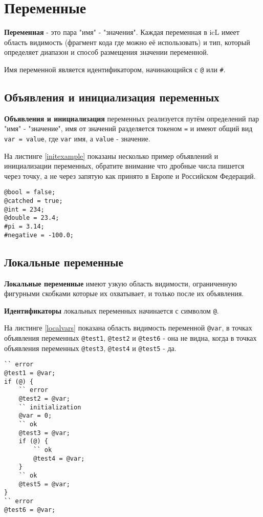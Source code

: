 \section{Переменные}

\textbf{Переменная} - это пара "имя" - "значения". Каждая переменная в icL имеет область видимость (фрагмент кода где можно её использовать) и тип, который определяет диапазон и способ размещения значении переменной.

Имя переменной является идентификатором, начинающийся с \texttt{@} или {\color{blue2}\texttt{#}}.

\subsection{Объявления и инициализация переменных}

\textbf{Объявления и инициализация} переменных реализуется путём определений пар "имя" - "значение", имя от значений разделяется токеном \texttt{=} и имеют общий вид \texttt{var = value}, где \texttt{var} имя, а \texttt{value} - значение.

На листинге \ref{initexample} показаны несколько пример объявлений и инициализации переменных, обратите внимание что дробные числа пишется через точку, а не через запятую как принято в Европе и Российском Федераций.

\begin{sourcecode}
\label{initexample}
\begin{verbatim}
@bool = false;
@catched = true;
@int = 234;
@double = 23.4;
#pi = 3.14;
#negative = -100.0;
\end{verbatim}
\end{sourcecode}

\subsection{Локальные переменные}

\textbf{Локальные переменные} имеют узкую область видимости, ограниченную фигурными скобками которые их охватывает, и только после их объявления.

{\bf Идентификаторы} локальных переменных начинается с символом \texttt{@}.

На листинге \ref{localvars} показана область видимость переменной \texttt{@var}, в точках объявления переменных \texttt{@test1}, \texttt{@test2} и \texttt{@test6} - она не видна, когда в точках объявления переменных \texttt{@test3}, \texttt{@test4} и \texttt{@test5} - да.
\begin{sourcecode}
\label{localvars}
\begin{verbatim}
`` error
@test1 = @var;
if (@) {
	`` error
	@test2 = @var;
	`` initialization
	@var = 0;
	`` ok
	@test3 = @var;
	if (@) {
		`` ok
		@test4 = @var;
	}
	`` ok
	@test5 = @var;
}
`` error
@test6 = @var;
\end{verbatim}
\end{sourcecode}

